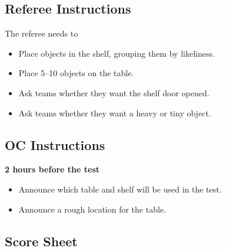 \subsection*{Referee Instructions}
The referee needs to
\begin{itemize}
	\item Place objects in the shelf, grouping them by likeliness.
	\item Place 5--10 objects on the table.
	\item Ask teams whether they want the shelf door opened.
	\item Ask teams whether they want a heavy or tiny object.
\end{itemize}

\subsection*{OC Instructions}

\textbf{2 hours before the test}
\begin{itemize}
	\item Announce which table and shelf will be used in the test.
	\item Announce a rough location for the table.
\end{itemize}




\subsection*{Score Sheet}


